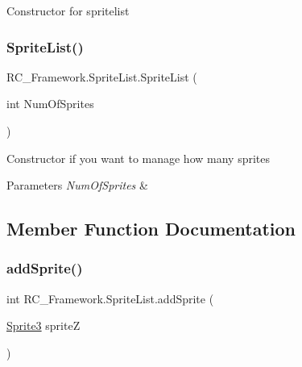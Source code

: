 Constructor for spritelist 

\mbox{\label{class_r_c___framework_1_1_sprite_list_ab960d5ea8bbf16fe40562fc083ce8059}} 
\subsubsection{\texorpdfstring{Sprite\+List()}{SpriteList()}\hspace{0.1cm}{\footnotesize\ttfamily [2/2]}}
{\footnotesize\ttfamily R\+C\+\_\+\+Framework.\+Sprite\+List.\+Sprite\+List (\begin{DoxyParamCaption}\item[{int}]{Num\+Of\+Sprites }\end{DoxyParamCaption})}



Constructor if you want to manage how many sprites 


\begin{DoxyParams}{Parameters}
{\em Num\+Of\+Sprites} & \\
\hline
\end{DoxyParams}


\subsection{Member Function Documentation}
\mbox{\label{class_r_c___framework_1_1_sprite_list_a8f45da7ee7263d6f9167a2961e14a412}} 
\subsubsection{\texorpdfstring{add\+Sprite()}{addSprite()}}
{\footnotesize\ttfamily int R\+C\+\_\+\+Framework.\+Sprite\+List.\+add\+Sprite (\begin{DoxyParamCaption}\item[{\mbox{\hyperlink{class_r_c___framework_1_1_sprite3}{Sprite3}}}]{spriteZ }\end{DoxyParamCaption})}



